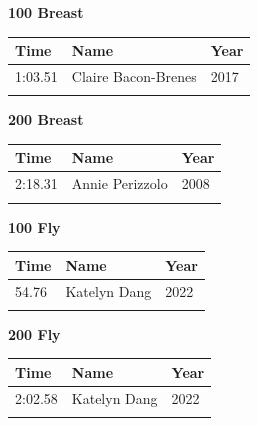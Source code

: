 \hfill
\begin{minipage}[t]{0.48\textwidth}
\centering
\textbf{\textcolor{teamprimary}{100 Breast}}\par
\vspace{0.5em}
\centering
\small
\renewcommand{\arraystretch}{1.0}
\setlength{\tabcolsep}{4pt}
\begin{tabular}{@{}p{1.8cm}p{3.0cm}p{1.0cm}@{}}
\toprule
\textbf{Time} & \textbf{Name} & \textbf{Year} \\
\midrule
1:03.51 & Claire Bacon-Brenes & 2017 \\
\bottomrule
\vspace{0.5em}
\end{tabular}
\end{minipage}
\vspace{1.2em}
\noindent\begin{minipage}[t]{0.48\textwidth}
\centering
\textbf{\textcolor{teamprimary}{200 Breast}}\par
\vspace{0.5em}
\centering
\small
\renewcommand{\arraystretch}{1.0}
\setlength{\tabcolsep}{4pt}
\begin{tabular}{@{}p{1.8cm}p{3.0cm}p{1.0cm}@{}}
\toprule
\textbf{Time} & \textbf{Name} & \textbf{Year} \\
\midrule
2:18.31 & Annie Perizzolo & 2008 \\
\bottomrule
\vspace{0.5em}
\end{tabular}
\end{minipage}
\hfill
\begin{minipage}[t]{0.48\textwidth}
\centering
\textbf{\textcolor{teamprimary}{100 Fly}}\par
\vspace{0.5em}
\centering
\small
\renewcommand{\arraystretch}{1.0}
\setlength{\tabcolsep}{4pt}
\begin{tabular}{@{}p{1.8cm}p{3.0cm}p{1.0cm}@{}}
\toprule
\textbf{Time} & \textbf{Name} & \textbf{Year} \\
\midrule
54.76 & Katelyn Dang & 2022 \\
\bottomrule
\vspace{0.5em}
\end{tabular}
\end{minipage}
\vspace{1.2em}
\noindent\begin{minipage}[t]{0.48\textwidth}
\centering
\textbf{\textcolor{teamprimary}{200 Fly}}\par
\vspace{0.5em}
\centering
\small
\renewcommand{\arraystretch}{1.0}
\setlength{\tabcolsep}{4pt}
\begin{tabular}{@{}p{1.8cm}p{3.0cm}p{1.0cm}@{}}
\toprule
\textbf{Time} & \textbf{Name} & \textbf{Year} \\
\midrule
2:02.58 & Katelyn Dang & 2022 \\
\bottomrule
\vspace{0.5em}
\end{tabular}
\end{minipage}
